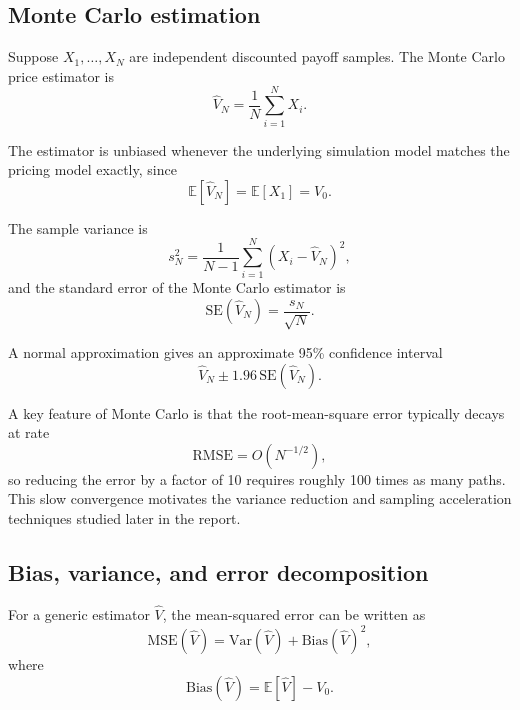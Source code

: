 \documentclass[11pt]{article}
\begin{document}
\subsection{Monte Carlo estimation}

Suppose $X_1,\dots,X_N$ are independent discounted payoff samples. The Monte Carlo price estimator is
\begin{equation}
\hat{V}_N = \frac{1}{N}\sum_{i=1}^{N} X_i.
\end{equation}

The estimator is unbiased whenever the underlying simulation model matches the pricing model exactly, since
\begin{equation}
\mathbb{E}[\hat{V}_N] = \mathbb{E}[X_1] = V_0.
\end{equation}

The sample variance is
\begin{equation}
s_N^2 = \frac{1}{N-1}\sum_{i=1}^{N}(X_i - \hat{V}_N)^2,
\end{equation}
and the standard error of the Monte Carlo estimator is
\begin{equation}
\mathrm{SE}(\hat{V}_N) = \frac{s_N}{\sqrt{N}}.
\end{equation}

A normal approximation gives an approximate 95\% confidence interval
\begin{equation}
\hat{V}_N \pm 1.96\,\mathrm{SE}(\hat{V}_N).
\end{equation}

A key feature of Monte Carlo is that the root-mean-square error typically decays at rate
\begin{equation}
\mathrm{RMSE} = O(N^{-1/2}),
\end{equation}
so reducing the error by a factor of 10 requires roughly 100 times as many paths. This slow convergence motivates the variance reduction and sampling acceleration techniques studied later in the report.

\subsection{Bias, variance, and error decomposition}

For a generic estimator $\hat{V}$, the mean-squared error can be written as
\begin{equation}
\mathrm{MSE}(\hat{V}) = \mathrm{Var}(\hat{V}) + \mathrm{Bias}(\hat{V})^2,
\end{equation}
where
\begin{equation}
\mathrm{Bias}(\hat{V}) = \mathbb{E}[\hat{V}] - V_0.
\end{equation}
\end{document}
